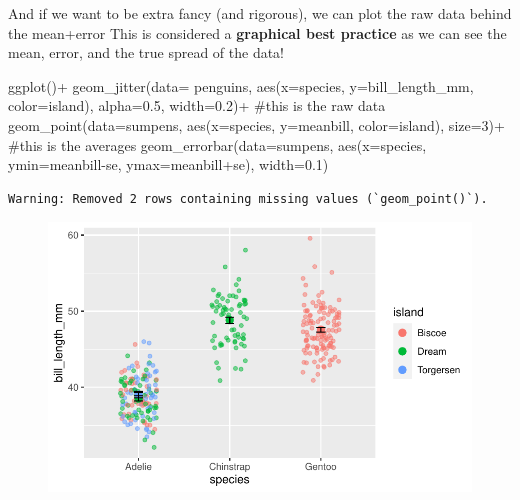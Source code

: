 \documentclass[
  letterpaper,
  DIV=11,
  numbers=noendperiod]{scrartcl}
\newenvironment{Shaded}{\begin{snugshade}}{\end{snugshade}}
\newcommand{\AttributeTok}[1]{\textcolor[rgb]{0.40,0.45,0.13}{#1}}
\newcommand{\CommentTok}[1]{\textcolor[rgb]{0.37,0.37,0.37}{#1}}
\newcommand{\DecValTok}[1]{\textcolor[rgb]{0.68,0.00,0.00}{#1}}
\newcommand{\FloatTok}[1]{\textcolor[rgb]{0.68,0.00,0.00}{#1}}
\newcommand{\FunctionTok}[1]{\textcolor[rgb]{0.28,0.35,0.67}{#1}}
\newcommand{\NormalTok}[1]{\textcolor[rgb]{0.00,0.23,0.31}{#1}}
\newcommand{\SpecialCharTok}[1]{\textcolor[rgb]{0.37,0.37,0.37}{#1}}
\begin{document}
And if we want to be extra fancy (and rigorous), we can plot the raw
data behind the mean+error This is considered a \textbf{graphical best
practice} as we can see the mean, error, and the true spread of the
data!

\begin{Shaded}
\begin{Highlighting}[]
\FunctionTok{ggplot}\NormalTok{()}\SpecialCharTok{+}
  \FunctionTok{geom\_jitter}\NormalTok{(}\AttributeTok{data=}\NormalTok{ penguins, }\FunctionTok{aes}\NormalTok{(}\AttributeTok{x=}\NormalTok{species, }\AttributeTok{y=}\NormalTok{bill\_length\_mm, }\AttributeTok{color=}\NormalTok{island), }\AttributeTok{alpha=}\FloatTok{0.5}\NormalTok{, }\AttributeTok{width=}\FloatTok{0.2}\NormalTok{)}\SpecialCharTok{+} \CommentTok{\#this is the raw data}
  \FunctionTok{geom\_point}\NormalTok{(}\AttributeTok{data=}\NormalTok{sumpens, }\FunctionTok{aes}\NormalTok{(}\AttributeTok{x=}\NormalTok{species, }\AttributeTok{y=}\NormalTok{meanbill, }\AttributeTok{color=}\NormalTok{island), }\AttributeTok{size=}\DecValTok{3}\NormalTok{)}\SpecialCharTok{+} \CommentTok{\#this is the averages}
  \FunctionTok{geom\_errorbar}\NormalTok{(}\AttributeTok{data=}\NormalTok{sumpens, }\FunctionTok{aes}\NormalTok{(}\AttributeTok{x=}\NormalTok{species, }\AttributeTok{ymin=}\NormalTok{meanbill}\SpecialCharTok{{-}}\NormalTok{se, }\AttributeTok{ymax=}\NormalTok{meanbill}\SpecialCharTok{+}\NormalTok{se), }\AttributeTok{width=}\FloatTok{0.1}\NormalTok{)}
\end{Highlighting}
\end{Shaded}

\begin{verbatim}
Warning: Removed 2 rows containing missing values (`geom_point()`).
\end{verbatim}

\begin{figure}[H]

{\centering \includegraphics{basic_graphs_files/figure-pdf/unnamed-chunk-19-1.pdf}

}

\end{figure}
\end{document}
